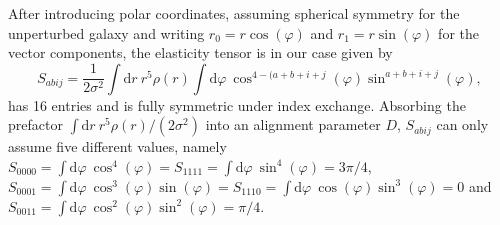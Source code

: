 \documentclass[a4paper,fleqn,usenatbib]{mnras}
\newcommand{\dd}{\mathrm{d}}
\begin{document}
After introducing polar coordinates, assuming spherical symmetry for the unperturbed galaxy and writing $r_0=r\cos(\varphi)$ and $r_1=r\sin(\varphi)$ for the vector components, the elasticity tensor is in our case given by
\begin{equation}
S_{abij} = 
\frac{1}{2\sigma^2}\int\dd r\:r^5\rho(r)\int\dd\varphi\:\cos^{4-(a+b+i+j}(\varphi)\sin^{a+b+i+j}(\varphi),
\end{equation}
has 16 entries and is fully symmetric under index exchange. Absorbing the prefactor $\int\dd r\:r^5\rho(r)/(2\sigma^2)$ into an alignment parameter $D$, $S_{abij}$ can only assume five different values, namely $S_{0000} = \int\dd\varphi\:\cos^4(\varphi) = S_{1111} = \int\dd\varphi\:\sin^4(\varphi) = 3\pi/4$, $S_{0001} = \int\dd\varphi\:\cos^3(\varphi)\sin(\varphi) = S_{1110} = \int\dd\varphi\:\cos(\varphi)\sin^3(\varphi) = 0$ and $S_{0011} = \int\dd\varphi\:\cos^2(\varphi)\sin^2(\varphi) = \pi/4$. 
\end{document}
